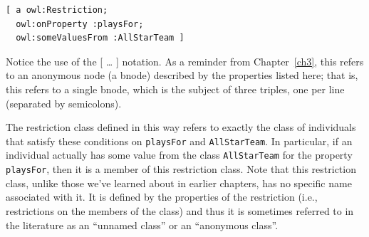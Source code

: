 \begin{lstlisting}
[ a owl:Restriction;
  owl:onProperty :playsFor; 
  owl:someValuesFrom :AllStarTeam ]
\end{lstlisting}

Notice the use of the {[} \ldots{} {]} notation. As a reminder from
Chapter~\ref{ch3}, this refers to an anonymous node (a bnode) described by the
properties listed here; that is, this refers to a single bnode, which is
the subject of three triples, one per line (separated by semicolons).

The restriction class defined in this way refers to exactly the class of
individuals that satisfy these conditions on \texttt{playsFor} and \texttt{AllStarTeam}.
In particular, if an individual actually has some value from the class
\texttt{AllStarTeam} for the property \texttt{playsFor}, then it is a member of this
restriction class. Note that this restriction class, unlike those we've
learned about in earlier chapters, has no specific name associated with
it. It is defined by the properties of the restriction (i.e.,
restrictions on the members of the class) and thus it is sometimes
referred to in the literature as an ``unnamed class'' or an ``anonymous class''.

